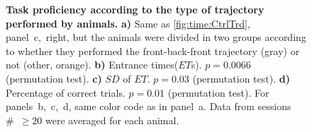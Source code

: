 \begin{figure}[!h]
  \begin{center}
    \caption[Different Control Trajectory Groups]
    {\textbf{Task proficiency according to the type of trajectory performed by animals.}
    \textbf{a)}
    Same as \autoref{fig:time:CtrlTrd}, panel~c,~right, but the animals were divided in two groups according to whether they performed the front-back-front trajectory (gray) or not (other, orange).
    \textbf{b)}
    Entrance times($ET$s).
    $p=0.0066$ (permutation test).
    \textbf{c)}
    $SD$ of $ET$.
    $p=0.03$ (permutation test).
    \textbf{d)}
    Percentage of correct trials.
    $p=0.01$ (permutation test).
    For panels~b,~c,~d, same color code as in panel~a.
    Data from sessions \#~$\geq20$ were averaged for each animal.
    }
    \label{fig:appendix:BadCtrl}
  \end{center}
\end{figure} 
